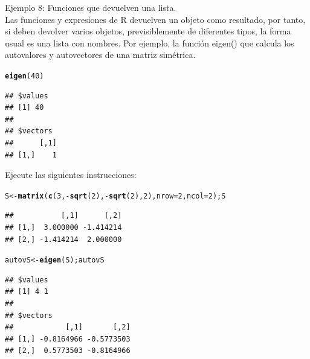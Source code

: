 \documentclass[12pt,letterpaper]{article}\usepackage[]{graphicx}\usepackage[]{color}
\makeatletter
\newcommand{\hlnum}[1]{\textcolor[rgb]{0.686,0.059,0.569}{#1}}%
\newcommand{\hlopt}[1]{\textcolor[rgb]{0,0,0}{#1}}%
\newcommand{\hlstd}[1]{\textcolor[rgb]{0.345,0.345,0.345}{#1}}%
\newcommand{\hlkwb}[1]{\textcolor[rgb]{0.69,0.353,0.396}{#1}}%
\newcommand{\hlkwc}[1]{\textcolor[rgb]{0.333,0.667,0.333}{#1}}%
\newcommand{\hlkwd}[1]{\textcolor[rgb]{0.737,0.353,0.396}{\textbf{#1}}}%
\newenvironment{kframe}{%
 \def\at@end@of@kframe{}%
 \ifinner\ifhmode%
  \def\at@end@of@kframe{\end{minipage}}%
  \begin{minipage}{\columnwidth}%
 \fi\fi%
 \def\FrameCommand##1{\hskip\@totalleftmargin \hskip-\fboxsep
 \colorbox{shadecolor}{##1}\hskip-\fboxsep
     \hskip-\linewidth \hskip-\@totalleftmargin \hskip\columnwidth}%
 \MakeFramed {\advance\hsize-\width
   \@totalleftmargin\z@ \linewidth\hsize
   \@setminipage}}%
 {\par\unskip\endMakeFramed%
 \at@end@of@kframe}
\newenvironment{knitrout}{}{} %
\makeatother
\begin{document}
Ejemplo 8: Funciones que devuelven una lista.\\

Las funciones y expresiones de R devuelven un objeto como resultado, por tanto, si deben devolver varios objetos, previsiblemente de diferentes tipos, la forma usual es una lista con nombres. Por ejemplo, la funci\'on eigen() que calcula los autovalores y autovectores de una matriz sim\'etrica.

\begin{knitrout}
\color{fgcolor}\begin{kframe}
\begin{alltt}
\hlkwd{eigen}\hlstd{(}\hlnum{40}\hlstd{)}
\end{alltt}
\begin{verbatim}
## $values
## [1] 40
## 
## $vectors
##      [,1]
## [1,]    1
\end{verbatim}
\end{kframe}
\end{knitrout}

Ejecute las siguientes instrucciones: 
\begin{knitrout}
\color{fgcolor}\begin{kframe}
\begin{alltt}
\hlstd{S} \hlkwb{<-} \hlkwd{matrix}\hlstd{(}\hlkwd{c}\hlstd{(}\hlnum{3}\hlstd{,} \hlopt{-}\hlkwd{sqrt}\hlstd{(}\hlnum{2}\hlstd{),} \hlopt{-}\hlkwd{sqrt}\hlstd{(}\hlnum{2}\hlstd{),} \hlnum{2}\hlstd{),} \hlkwc{nrow}\hlstd{=}\hlnum{2}\hlstd{,} \hlkwc{ncol}\hlstd{=}\hlnum{2}\hlstd{); S}
\end{alltt}
\begin{verbatim}
##           [,1]      [,2]
## [1,]  3.000000 -1.414214
## [2,] -1.414214  2.000000
\end{verbatim}
\begin{alltt}
\hlstd{autovS} \hlkwb{<-} \hlkwd{eigen}\hlstd{(S); autovS}
\end{alltt}
\begin{verbatim}
## $values
## [1] 4 1
## 
## $vectors
##            [,1]       [,2]
## [1,] -0.8164966 -0.5773503
## [2,]  0.5773503 -0.8164966
\end{verbatim}
\end{kframe}
\end{knitrout}
\end{document}
